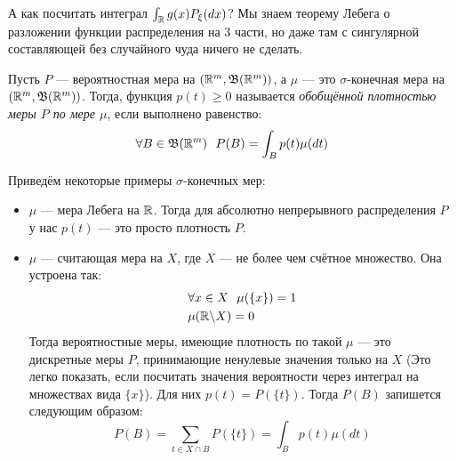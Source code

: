 \begin{note}
	А как посчитать интеграл $\int_{\mathbb{R}} g(x)P_\xi(dx)$? Мы знаем теорему Лебега о разложении функции распределения на 3 части, но даже там с сингулярной составляющей без случайного чуда ничего не сделать.
\end{note}

\begin{definition}
	Пусть $P$ --- вероятностная мера на $(\mathbb{R}^m, \mathfrak{B}(\mathbb{R}^m))$, а $\mu$ --- это $\sigma$-конечная мера на $(\mathbb{R}^m, \mathfrak{B}(\mathbb{R}^m))$. Тогда, функция $p(t) \ge 0$ называется \textit{обобщённой плотностью меры $P$ по мере $\mu$}, если выполнено равенство:
	\[
		\forall B \in \mathfrak{B}(\mathbb{R}^m)\ \ P(B) = \int_B p(t)\mu(dt)
	\]
\end{definition}

\begin{example}
	Приведём некоторые примеры $\sigma$-конечных мер:
	\begin{itemize}
		\item $\mu$ --- мера Лебега на $\mathbb{R}$. Тогда для абсолютно непрерывного распределения $P$ у нас $p(t)$ --- это просто плотность $P$.
		
		\item $\mu$ --- считающая мера на $X$, где $X$ --- не более чем счётное множество. Она устроена так:
		\begin{align*}
			&{\forall x \in X\ \ \mu(\{x\}) = 1}
			\\
			&{\mu(\mathbb{R} \backslash X) = 0}
		\end{align*}
		Тогда вероятностные меры, имеющие плотность по такой $\mu$ --- это дискретные меры $P$, принимающие ненулевые значения только на $X$ (Это легко показать, если посчитать значения вероятности через интеграл на множествах вида $\{x\}$). Для них $p(t) = P(\{t\})$. Тогда $P(B)$ запишется следующим образом:
		\[
			P(B) = \sum_{t \in X \cap B} P(\{t\}) = \int_B p(t)\mu(dt)
		\]
	\end{itemize}
\end{example}